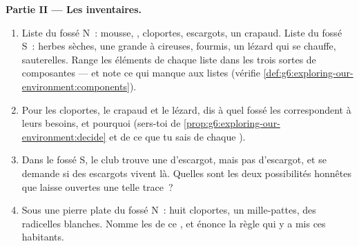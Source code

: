 \begin{problem}
\medskip\noindent\textbf{Partie II --- Les inventaires.}
\begin{enumerate}[resume]
  \item Liste du fossé N~: mousse, , cloportes, escargots,
        un crapaud. Liste du fossé S~: herbes sèches, une grande
         à  cireuses, fourmis, un lézard qui se
        chauffe, sauterelles. Range les éléments de chaque liste
        dans les trois sortes de composantes --- et note ce qui
        manque aux listes (vérifie
        \cref{def:g6:exploring-our-environment:components}).
  \item Pour les cloportes, le crapaud et le lézard, dis à quel
        fossé les  correspondent à leurs besoins, et
        pourquoi (sers-toi de
        \cref{prop:g6:exploring-our-environment:decide} et de ce
        que tu sais de chaque ).
  \item Dans le fossé S, le club trouve une  d'escargot,
        mais pas d'escargot, et se demande si des escargots vivent
        là. Quelles sont les deux possibilités honnêtes que laisse
        ouvertes une telle trace~?
  \item Sous une pierre plate du fossé N~: huit cloportes, un
        mille-pattes, des radicelles blanches. Nomme les 
        de ce , et énonce la règle qui y a mis ces
        habitants.
\end{enumerate}


\end{problem}
